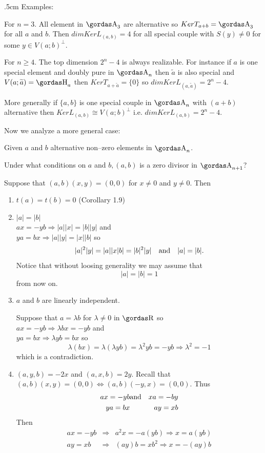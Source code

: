 \vglue.5cm
\noindent
{\bsbf Examples:}
\par 
For $n=3$. All element in $\a_{3}$ are alternative so 
$Ker T_{a+b}=\a_{3}$ for all
$a$ and $b$. Then $dim Ker L_{(a,b)}=4$ for all special couple with
$S(y)\neq 0$ for some $y\in V(a;b)^{\perp}$.
\par 
For $n\ge 4$. The top dimension $2^{n}-4$ is always realizable. For instance if $a$
is one special element and doubly pure in $\a_{n}$ then $\widetilde{a}$ is also
special and $V(a;\widetilde{a})=\ache_{a}$ then $Ker T_{a+\widetilde{a}}=\{0\}$
so $dim Ker L_{(a,\widetilde{a})}=2^{n}-4$.
\par 
More generally if $\{a,b\}$ is one special couple in $\a_{n}$ with $(a+b)$
alternative then $Ker L_{(a,b)}\cong V(a;b)^{\perp}$ i.e. $dim Ker L_{(a,b)}=2^{n}-4$.
\par 
Now we analyze a more general case:
\par 
Given $a$ and $b$ alternative non--zero elements in $\a_{n}$.
\par 
{\bsit 
Under what conditions on $a$ and $b, (a,b)$ is a zero divisor in $\a_{n+1}$?}
\par 
Suppose that $(a,b)(x,y)=(0,0)$ for $x\neq 0$ and $y\neq 0$. Then
\begin{enumerate}
\item[1)] $t(a)=t(b)=0$ (Corollary 1.9)
\item[2)] $|a|=|b|$\\
$ax=-yb\Rightarrow |a||x|=|b||y|$ and\\
$ya=bx\Rightarrow |a||y|=|x||b|$ so
$$|a|^{2}|y|=|a||x|b|=|b|^{2}|y|\quad\hbox{\rm and}\quad |a|=|b|.$$
Notice that without loosing generality we may assume that
$$|a|=|b|=1$$ 
from now on.
\item[3)] $a$ and $b$ are linearly independent.
\par 
Suppose that $a=\lambda b$ for $\lambda\neq 0$ in $\erre$ so\\
$ax=-yb\Rightarrow \lambda bx=-yb$ and\\
$ya=bx\Rightarrow \lambda yb=bx$ so
$$\lambda (bx)=\lambda(\lambda yb)=\lambda^{2}yb=-yb\Rightarrow \lambda^{2}=-1$$
which is a contradiction.
\item[4)] $(a,y,b)=-2x$ and $(a,x,b)=2y$. Recall that 
$(a,b)(x,y)=(0,0)\Leftrightarrow (a,b)(-y,x)=(0,0)$. Thus
\begin{eqnarray*}
ax=-yb&\hbox{\rm and}&xa=-by\\
ya=bx&&ay=xb
\end{eqnarray*}
Then
\begin{eqnarray*}
ax=-yb&\Rightarrow&a^{2}x=-a(yb)\Rightarrow x=a(yb)\\
ay=xb&\Rightarrow&(ay)b=xb^{2}\Rightarrow x=-(ay)b
\end{eqnarray*}
\end{enumerate}
